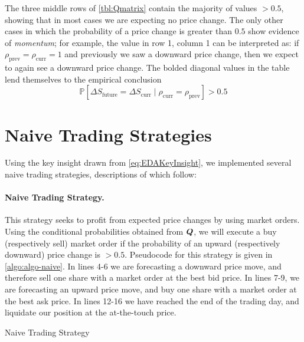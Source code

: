 The three middle rows of \autoref{tbl:Qmatrix} contain the majority of values $>0.5$, showing that in most cases we are expecting no price change. The only other cases in which the probability of a price change is greater than $0.5$ show evidence of \textit{momentum}; for example, the value in row 1, column 1 can be interpreted as: if $\rho_\text{prev} = \rho_\text{curr} = 1$ and previously we saw a downward price change, then we expect to again see a downward price change. The bolded diagonal values in the table lend themselves to the empirical conclusion
\begin{equation}\label{eq:EDAKeyInsight}
\mathbb{P} \left[ \Delta S_\text{future} = \Delta S_\text{curr} \; | \; \rho_\text{curr} = \rho_\text{prev} \right] > 0.5
\end{equation}

\section{Naive Trading Strategies}
Using the key insight drawn from \eqref{eq:EDAKeyInsight}, we implemented several naive trading strategies, descriptions of which follow:

\paragraph{Naive Trading Strategy.}  This strategy seeks to profit from expected price changes by using market orders. Using the conditional probabilities obtained from $\boldsymbol{Q}$, we will execute a buy (respectively sell) market order if the probability of an upward (respectively downward) price change is $> 0.5$. Pseudocode for this strategy is given in \autoref{algo:algo-naive}. In lines 4-6 we are forecasting a downward price move, and therefore sell one share with a market order at the best bid price. In lines 7-9, we are forecasting an upward price move, and buy one share with a market order at the best ask price. In lines 12-16 we have reached the end of the trading day, and liquidate our position at the at-the-touch price.
\begin{algorithm}[htb]
	\caption{Naive Trading Strategy}
	
	\label{algo:algo-naive}
\end{algorithm}

\clearpage
